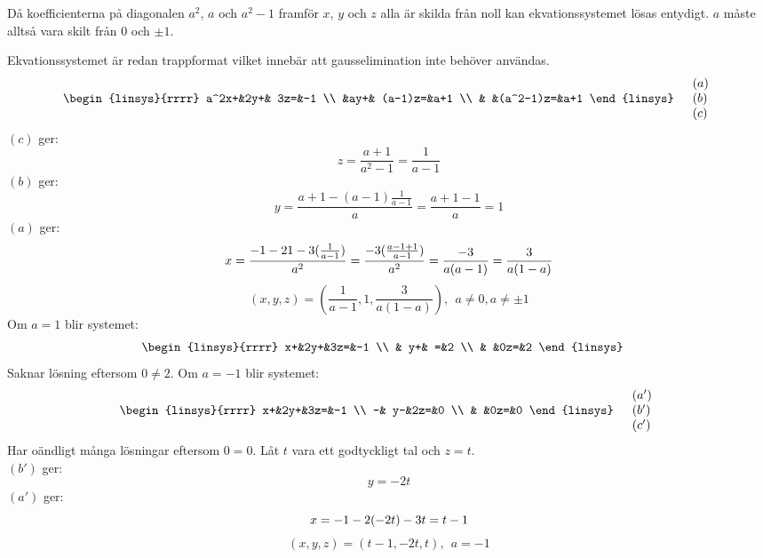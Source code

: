 \begin{task}{1.17}
	Då koefficienterna på diagonalen $a^2$, $a$ och $a^2-1$ framför $x$, $y$ och $z$ alla är skilda från noll kan ekvationssystemet lösas entydigt. $a$ måste alltså vara skilt från 0 och $\pm1$.
	
	Ekvationssystemet är redan trappformat vilket innebär att gausselimination inte behöver användas.
	\begin{align*}
		&\begin{linsys}{rrrr}
			a^2x+&2y+&      3z=&-1 \\
			     &ay+&  (a-1)z=&a+1 \\
			     &   &(a^2-1)z=&a+1
		\end{linsys}
		&\begin{array}{l} 
			(a) \\ 
			(b) \\
			(c)
		\end{array}
	\end{align*}
	$(c)$ ger: 
	\[z=\frac{a+1}{a^2-1}=\frac{1}{a-1}\]
	$(b)$ ger:
	\[y=\frac{a+1-(a-1)\frac{1}{a-1}}{a}=\frac{a+1-1}{a}=1\]
	$(a)$ ger:
	\[x=\frac{-1-2\*1-3(\frac{1}{a-1})}{a^2}=\frac{-3(\frac{a-1+1}{a-1})}{a^2}=\frac{-3}{a(a-1)}=\frac{3}{a(1-a)}\]
	\[(x,y,z)=\left(\frac{1}{a-1},1,\frac{3}{a(1-a)}\right),~~a\neq0,a\neq\pm1\]
	Om $a=1$ blir systemet:
	\begin{align*}
		&\begin{linsys}{rrrr}
			x+&2y+&3z=&-1 \\
			  & y+&  =&2 \\
			  &   &0z=&2
		\end{linsys}
	\end{align*}
	Saknar lösning eftersom $0\neq2$.
	Om $a=-1$ blir systemet:
	\begin{align*}
		&\begin{linsys}{rrrr}
			x+&2y+&3z=&-1 \\
			 -& y-&2z=&0 \\
			  &   &0z=&0
		\end{linsys}
		&\begin{array}{l} 
			(a') \\ 
			(b') \\
			(c')
		\end{array}
	\end{align*}
	Har oändligt många lösningar eftersom $0=0$. Låt $t$ vara ett godtyckligt tal och $z=t$.\\
	$(b')$ ger:
	\[y=-2t\]
	$(a')$ ger:
	\[x=-1-2\*(-2t)-3t=t-1\]
	\[(x,y,z)=(t-1,-2t,t),~~a=-1\]

\end{task}
